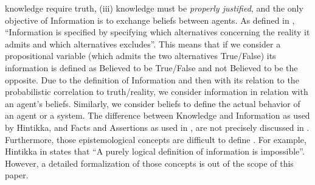 \documentclass[conference]{IEEEtran}
\begin{document}
knowledge require truth, (iii) knowledge must be \emph{properly justified}, and
the only objective of Information is to exchange beliefs between agents.  As
defined in \autocite{Hintikka1993Information}, ``Information is specified by
specifying which alternatives concerning the reality it admits and which
alternatives excludes''. This means that if we consider a propositional
variable (which admits the two alternatives True/False) its information is
defined as Believed to be True/False and not Believed to be the opposite.  Due
to the definition of Information and then with its relation to the
probabilistic correlation to truth/reality, we consider information in relation
with an agent's beliefs. Similarly, we consider beliefs to define the actual
behavior of an agent or a system.
The difference between Knowledge and Information as used by Hintikka, and Facts
and Assertions as used in \autocite{Santaca2016abf}, are not precisely discussed
in \autocite{Santaca2016abf}.  Furthermore, those epistemological concepts are
difficult to define
\autocite{Gettier2012knowledge}.
For example, Hintikka in
\autocite{Hintikka1993Information} states that ``A purely logical definition of
information is impossible''. However, a detailed formalization of those concepts is out
of the scope of this paper. 
\end{document}
